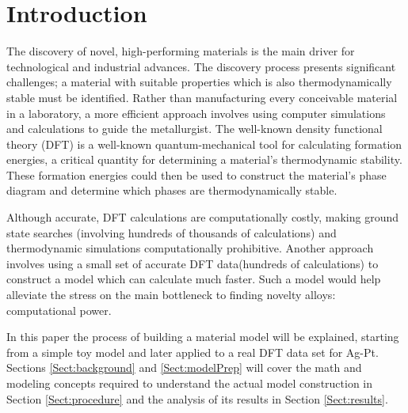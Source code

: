 \section{Introduction}\label{Sect:intro}
\par The discovery of novel, high-performing materials is the main driver for technological and industrial advances. The discovery process presents significant challenges; a material with suitable properties which is also thermodynamically stable must be identified. Rather than manufacturing every conceivable material in a laboratory, a more efficient approach involves using computer simulations and calculations to guide the metallurgist.  The well-known density functional theory (DFT) is a well-known quantum-mechanical tool for calculating formation energies, a critical quantity for determining a material's thermodynamic stability.  These formation energies could then be used to construct the material's phase diagram and determine which phases are thermodynamically stable. 
\par Although accurate, DFT calculations are computationally costly, making ground state searches (involving hundreds of thousands of calculations) and thermodynamic simulations computationally prohibitive. Another approach involves using a small set of accurate DFT data(hundreds of calculations) to construct a model which can calculate much faster.  Such a model would help alleviate the stress on the main bottleneck to finding novelty alloys: computational power. 
\par In this paper the process of building a material model will be explained, starting from a simple toy model and later applied to a real DFT data set for Ag-Pt.  Sections \ref{Sect:background} and \ref{Sect:modelPrep} will cover the math and modeling concepts required to understand the actual model construction in Section \ref{Sect:procedure} and the analysis of its results in Section \ref{Sect:results}. 